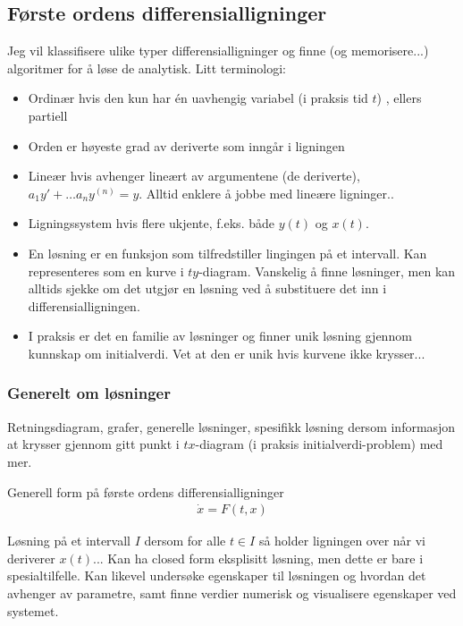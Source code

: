 \subsection{Første ordens differensialligninger}
Jeg vil klassifisere ulike typer differensialligninger og finne (og memorisere...) algoritmer for å løse de analytisk. Litt terminologi:
\begin{itemize}
\item Ordinær hvis den kun har én uavhengig variabel (i praksis tid $t$) , ellers partiell
\item Orden er høyeste grad av deriverte som inngår i ligningen
\item Lineær hvis avhenger lineært av argumentene (de deriverte), $a_1 y' + \dots a_n y^{(n)}=y$. Alltid enklere å jobbe med lineære ligninger..
\item Ligningssystem hvis flere ukjente, f.eks. både $y(t)$ og $x(t)$. 
\item En løsning er en funksjon som tilfredstiller lingingen på et intervall. Kan representeres som en kurve i $ty$-diagram. Vanskelig å finne løsninger, men kan alltids sjekke om det utgjør en løsning ved å substituere det inn i differensialligningen.
\item I praksis er det en familie av løsninger og finner unik løsning gjennom kunnskap om initialverdi. Vet at den er unik hvis kurvene ikke krysser... 
\end{itemize}
\subsubsection{Generelt om løsninger}
Retningsdiagram, grafer, generelle løsninger, spesifikk løsning dersom informasjon at krysser gjennom gitt punkt i $tx$-diagram (i praksis initialverdi-problem) med mer.

Generell form på første ordens differensialligninger
\begin{align}
\dot{x}=F(t,x)
\end{align}

Løsning på et intervall $I$ dersom for alle $t \in I$ så holder ligningen over når vi deriverer $x(t)$... Kan ha closed form eksplisitt løsning, men dette er bare i spesialtilfelle. Kan likevel undersøke egenskaper til løsningen og hvordan det avhenger av parametre, samt finne verdier numerisk og visualisere egenskaper ved systemet.
